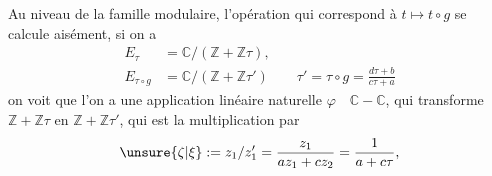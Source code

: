 Au niveau de la famille modulaire, l'opération qui correspond à $t\longmapsto t\circ g$ se calcule aisément, si on a
\[
\begin{aligned}
E_\tau&=\mathbb C/(\mathbb Z+\mathbb Z\tau),\\
E_{\tau\circ g}&=\mathbb C/(\mathbb Z+\mathbb Z\tau')
\qquad
\tau'=\tau\circ g=\frac{d\tau+b}{c\tau+a}
\end{aligned}
\]
on voit que l'on a une application  linéaire naturelle $\varphi\quad\mathbb C-\mathbb C$, qui transforme $\mathbb Z+\mathbb Z\tau$ en $\mathbb Z+\mathbb Z\tau'$, qui est la multiplication par
\[
\unsure{\zeta|\xi}:=z_1/z'_1
=\frac{z_1}{az_1+cz_2}
=\frac{1}{a+c\tau},
\]


